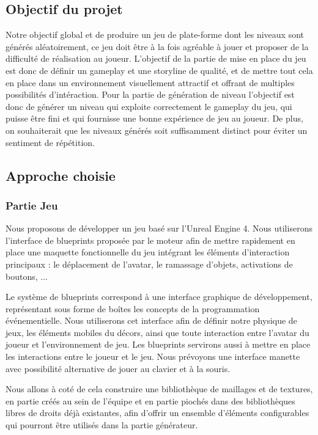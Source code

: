 \documentclass[12pt]{article}
\begin{document}
    \subsection{Objectif du projet}
        
        Notre objectif global et de produire un jeu de plate-forme dont les niveaux sont générés aléatoirement, ce jeu doit être à la fois agréable à jouer et proposer de la difficulté de réalisation au joueur. L'objectif de la partie de mise en place du jeu est donc de définir un gameplay et une storyline de qualité, et de mettre tout cela en place dans un environnement visuellement attractif et offrant de multiples possibilités d'intéraction. Pour la partie de génération de niveau l'objectif est donc de générer un niveau qui exploite correctement le gameplay du jeu, qui puisse être fini et qui fournisse une bonne expérience de jeu au joueur. De plus, on souhaiterait que les niveaux générés soit suffisamment distinct pour éviter un sentiment de répétition.
        
    \subsection{Approche choisie}
    
        \subsubsection{Partie Jeu}
            Nous proposons de développer un jeu basé sur l'Unreal Engine 4. Nous utiliserons l'interface de blueprints proposée par le moteur afin de mettre rapidement en place une maquette fonctionnelle du jeu intégrant les éléments d'interaction principaux : le déplacement de l'avatar, le ramassage d'objets, activations de boutons, ...
            
            Le système de blueprints correspond à une interface graphique de développement, représentant sous forme de boîtes les concepts de la programmation événementielle. Nous utiliserons cet interface afin de définir notre physique de jeux, les éléments mobiles du décors, ainsi que toute interaction entre l'avatar du joueur et l'environnement de jeu. Les blueprints servirons aussi à mettre en place les interactions entre le joueur et le jeu. Nous prévoyons une interface manette avec possibilité alternative de jouer au clavier et à la souris.
            
            Nous allons à coté de cela construire une bibliothèque de maillages et de textures, en partie créés au sein de l'équipe et en partie piochés dans des bibliothèques libres de droits déjà existantes, afin d'offrir un ensemble d'éléments configurables qui pourront être utilisés dans la partie générateur.
            
\end{document}
